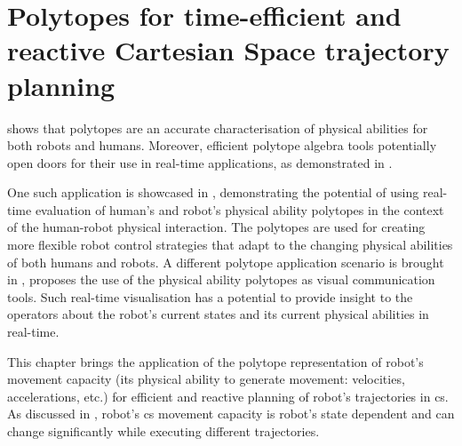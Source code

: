 
\chapter{Polytopes for time-efficient and reactive Cartesian Space trajectory planning}
\label{ch:topca}


 shows that polytopes are an accurate characterisation of physical abilities for both robots and humans. Moreover,  efficient polytope algebra tools potentially open doors for their use in real-time applications, as demonstrated in . 

One such application is showcased in , demonstrating the potential of using real-time evaluation of human's and robot's physical ability polytopes in the context of the human-robot physical interaction. The polytopes are used for creating more flexible robot control strategies that adapt to the changing physical abilities of both humans and robots. A different polytope application scenario is brought in , proposes the use of the physical ability polytopes as visual communication tools. Such real-time visualisation has a potential to provide insight to the operators about the robot's current states and its current physical abilities in real-time.








This chapter brings the application of the polytope representation of robot's movement capacity (its physical ability to generate movement: velocities, accelerations, etc.) for efficient and reactive planning of robot's trajectories in \gls{cs}. 
As discussed in , robot's \gls{cs} movement capacity is robot's state dependent and can change significantly while executing different trajectories. 

